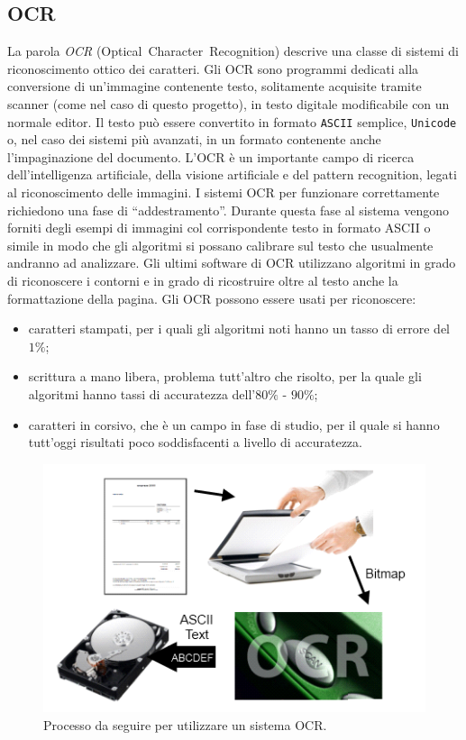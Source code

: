 \subsection{OCR}
	\label{subsec:ocr}
La parola \emph{OCR} (Optical~Character~Recognition) descrive una classe di sistemi di riconoscimento ottico dei caratteri.
Gli OCR sono programmi dedicati alla conversione di un'immagine contenente testo, solitamente acquisite tramite scanner (come nel caso di questo progetto), in testo digitale modificabile con un normale editor. Il testo può essere convertito in formato \texttt{ASCII} semplice, \texttt{Unicode} o, nel caso dei sistemi più avanzati, in un formato contenente anche l'impaginazione del documento.
L'OCR è un importante campo di ricerca dell'intelligenza artificiale, della visione artificiale e del pattern recognition, legati al riconoscimento delle immagini.
I sistemi OCR per funzionare correttamente richiedono una fase di ``addestramento''. Durante questa fase al sistema vengono forniti degli esempi di immagini col corrispondente testo in formato ASCII o simile in modo che gli algoritmi si possano calibrare sul testo che usualmente andranno ad analizzare. Gli ultimi software di OCR utilizzano algoritmi in grado di riconoscere i contorni e in grado di ricostruire oltre al testo anche la formattazione della pagina.
Gli OCR possono essere usati per riconoscere:
\begin{itemize}
	\item caratteri stampati, per i quali gli algoritmi noti hanno un tasso di errore del $1\%$;
	\item scrittura a mano libera, problema tutt'altro che risolto, per la quale gli algoritmi hanno tassi di accuratezza dell'$80\%$ - $90\%$;
	\item caratteri in corsivo, che è un campo in fase di studio, per il quale si hanno tutt'oggi risultati poco soddisfacenti a livello di accuratezza. 
\end{itemize}

	\begin{center}	
		\begin{figure}[H]
		\centering
		\includegraphics[scale=0.9]{Immagini/ocr}
		\caption[OCR]{Processo da seguire per utilizzare un sistema OCR.}
		\label{fig:usecase}
		\end{figure}
	\end{center}